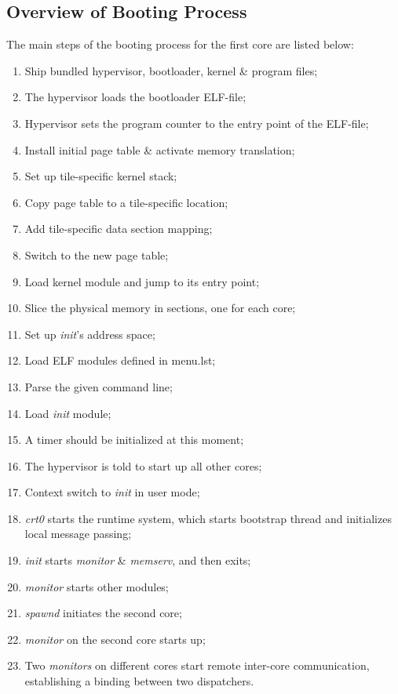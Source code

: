 \documentclass[a4paper,twoside]{report} %
\begin{document}
\subsection{Overview of Booting Process}
The main steps of the booting process for the first core are listed below:
\begin{enumerate}
  \item Ship bundled hypervisor, bootloader, kernel \& program files;
  \item The hypervisor loads the bootloader ELF-file;
  \item Hypervisor sets the program counter to the entry point of the ELF-file;
  \item Install initial page table \& activate memory translation;
  \item Set up tile-specific kernel stack;
  \item Copy page table to a tile-specific location;
  \item Add tile-specific data section mapping;
  \item Switch to the new page table;
  \item Load kernel module and jump to its entry point;
  \item Slice the physical memory in sections, one for each core;
  \item Set up \emph{init}'s address space;
  \item Load ELF modules defined in menu.lst;
  \item Parse the given command line;
  \item Load \emph{init} module;
  \item A timer should be initialized at this moment;
  \item The hypervisor is told to start up all other cores;
  \item Context switch to \emph{init} in user mode;
  \item \emph{crt0} starts the runtime system, which starts bootstrap thread and initializes local message passing;
  \item \emph{init} starts \emph{monitor} \& \emph{mem{\textunderscore}serv}, and then exits;
  \item \emph{monitor} starts other modules;
  \item \emph{spawnd} initiates the second core;
  \item \emph{monitor} on the second core starts up;
  \item Two \emph{monitors} on different cores start remote inter-core communication, establishing a binding between two dispatchers.
\end{enumerate}
\end{document}
